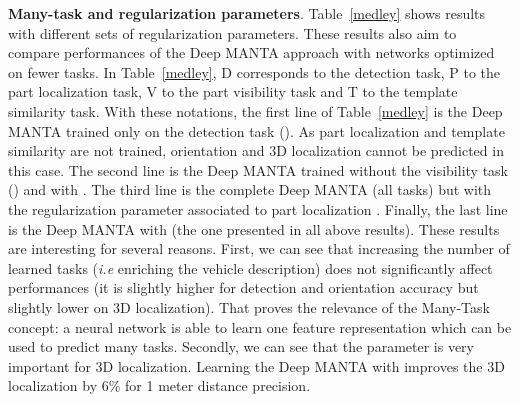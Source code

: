 \documentclass[10pt,twocolumn,letterpaper]{article}
\begin{document}
\textbf{Many-task and regularization parameters}. Table~\ref{medley} shows results with different sets of regularization parameters. These results also aim to compare performances of the Deep MANTA approach with networks optimized on fewer tasks. In Table~\ref{medley}, D corresponds to the detection task, P to the part localization task, V to the part visibility task and T to the template similarity task. With these notations, the first line of Table~\ref{medley} is the Deep MANTA trained only on the detection task (). As part localization and template similarity are not trained, orientation and 3D localization cannot be predicted in this case. The second line is the Deep MANTA trained without the visibility task () and with . The third line is the complete Deep MANTA (all tasks) but with the regularization parameter associated to part localization . Finally, the last line is the Deep MANTA with  (the one presented in all above results). These results are interesting for several reasons. First, we can see that increasing the number of learned tasks (\textit{i.e} enriching the vehicle description) does not significantly affect performances (it is slightly higher for detection and orientation accuracy but slightly lower on 3D localization). That proves the relevance of the Many-Task concept: a neural network is able to learn one feature representation which can be used to predict many tasks. Secondly, we can see that the parameter  is very important for 3D localization. Learning the Deep MANTA with  improves the 3D localization by  6\% for 1 meter distance precision.       
\end{document}
